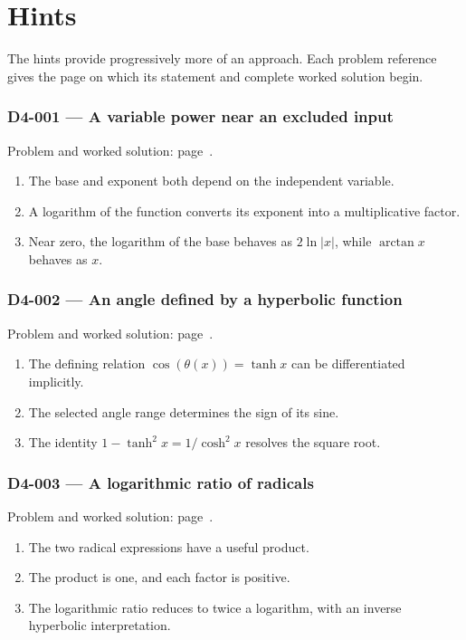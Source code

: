 \documentclass[11pt,oneside,openany]{book}
\begin{document}
\chapter{Hints}
\markright{}
The hints provide progressively more of an approach. Each problem reference gives the page on which its statement and complete worked solution begin.
\subsection*{D4-001 --- A variable power near an excluded input}
\label{hints:D4-001}
Problem and worked solution: page~\pageref{problem:D4-001}.

\begin{enumerate}
\item The base and exponent both depend on the independent variable.
\item A logarithm of the function converts its exponent into a multiplicative factor.
\item Near zero, the logarithm of the base behaves as \(2\ln|x|\), while \(\arctan x\) behaves as \(x\).
\end{enumerate}
\subsection*{D4-002 --- An angle defined by a hyperbolic function}
\label{hints:D4-002}
Problem and worked solution: page~\pageref{problem:D4-002}.

\begin{enumerate}
\item The defining relation \(\cos(\theta(x))=\tanh x\) can be differentiated implicitly.
\item The selected angle range determines the sign of its sine.
\item The identity \(1-\tanh^2x=1/\cosh^2x\) resolves the square root.
\end{enumerate}
\subsection*{D4-003 --- A logarithmic ratio of radicals}
\label{hints:D4-003}
Problem and worked solution: page~\pageref{problem:D4-003}.

\begin{enumerate}
\item The two radical expressions have a useful product.
\item The product is one, and each factor is positive.
\item The logarithmic ratio reduces to twice a logarithm, with an inverse hyperbolic interpretation.
\end{enumerate}
\end{document}
